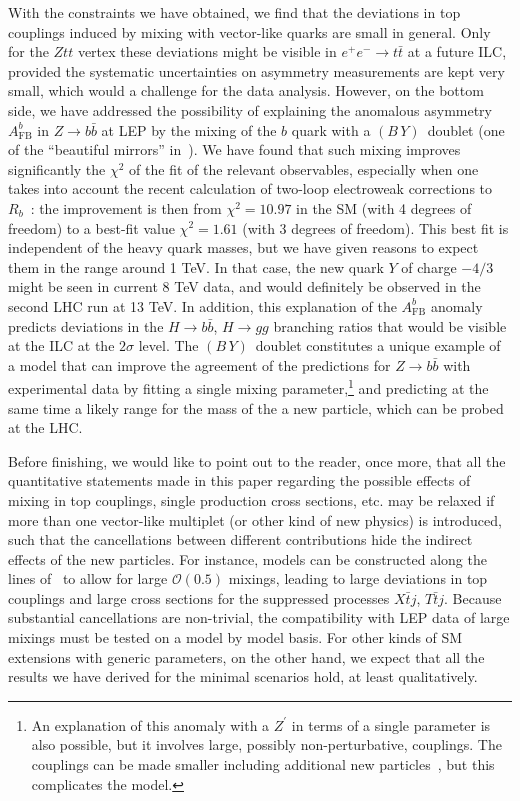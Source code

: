 \documentclass[12pt,a4paper]{article}
\newcommand{\by}{$(B\,Y)$}
\begin{document}
With the constraints we have obtained, we find that the deviations in top couplings induced by mixing with vector-like quarks are small in general. Only for the $Ztt$ vertex these deviations might be visible in $e^+ e^- \to t \bar t$ at a future ILC, provided the systematic uncertainties on asymmetry measurements are kept very small, which would a challenge for the data analysis. However, on the bottom side, we have addressed the possibility of explaining the anomalous asymmetry $A_\text{FB}^b$ in $Z \to b \bar b$ at LEP by the mixing of the $b$ quark with a \by\ doublet (one of the ``beautiful mirrors'' in~\cite{Choudhury:2001hs}). We have found that such mixing improves significantly the $\chi^2$ of the fit of the relevant observables, especially when one takes into account the recent calculation of two-loop electroweak corrections to $R_b$~\cite{Freitas:2012sy}: the improvement is then from $\chi^2 = 10.97$ in the SM (with 4 degrees of freedom) to a best-fit value $\chi^2=1.61$ (with 3 degrees of freedom). This best fit is independent of the heavy quark masses, but we have given reasons to expect them in the range around 1 TeV. In that case, the new quark $Y$ of charge $-4/3$ might be seen in current 8 TeV data, and would definitely be observed in the second LHC run at 13 TeV. In addition, this explanation of the $A_\text{FB}^b$ anomaly predicts deviations in the $H \to b \bar b$, $H \to gg$ branching ratios that would be visible at the ILC at the $2\sigma$ level.
The \by\ doublet constitutes a unique example of a model that can improve the agreement of the predictions for $Z \to b \bar b$ with experimental data by fitting a single mixing parameter,\footnote{An explanation of this anomaly with a $Z^\prime$ in terms of a single parameter is also possible, but it involves large, possibly non-perturbative, couplings. The couplings can be made smaller including additional new particles~\cite{delAguila:2010mx}, but this complicates the model.} and predicting at the same time a likely range for the mass of the a new particle, which can be probed at the LHC.

Before finishing, we would like to point out to the reader, once more, that all the quantitative statements made in this paper regarding the possible effects of mixing in top couplings, single production cross sections, etc. may be relaxed if more than one vector-like multiplet (or other kind of new physics) is introduced, such that the cancellations between different contributions hide the indirect effects of the new particles. For instance, models can be constructed along the lines of~\cite{Atre:2011ae} to allow for large $\mathcal{O}(0.5)$ mixings, leading to large deviations in top couplings and large cross sections for the suppressed processes $X \bar t j$, $T \bar t j$.  Because substantial cancellations are non-trivial, the compatibility with LEP data of large mixings must be tested on a model by model basis. For other kinds of SM extensions with generic parameters, on the other hand, we expect that all the results we have derived for the minimal scenarios hold, at least qualitatively. 
\end{document}
